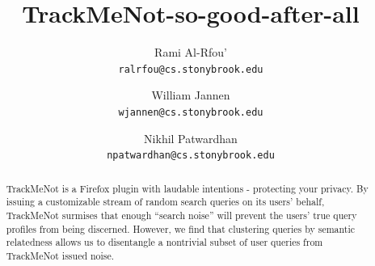 \documentclass[11pt]{article}
\title{TrackMeNot-so-good-after-all}
\author{Rami Al-Rfou' \\{\texttt{ralrfou@cs.stonybrook.edu}}
\and William Jannen \\{\texttt{wjannen@cs.stonybrook.edu}}
\and Nikhil Patwardhan \\{\texttt{npatwardhan@cs.stonybrook.edu}}
}
\begin{document}
\maketitle

\pagestyle{headings}

\begin{abstract}
  TrackMeNot is a Firefox plugin with laudable intentions - protecting
  your privacy. By issuing a customizable stream of random search
  queries on its users' behalf, TrackMeNot surmises that enough
  ``search noise'' will prevent the users' true query profiles from
  being discerned. However, we find that clustering queries by
  semantic relatedness allows us to disentangle a nontrivial subset of
  user queries from TrackMeNot issued noise.
\end{abstract}
\end{document}

